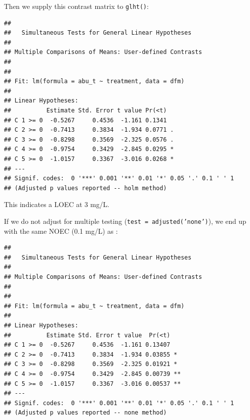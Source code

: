 Then we supply this contrast matrix to \texttt{glht()}:
\begin{knitrout}
\color{fgcolor}\begin{kframe}
\begin{alltt}
\hlstd{(}  \hlstd{=} \hlstd{(} 
              \hlstd{=} \hlstd{),}
         \hlstd{=} \hlstd{(}\hlstd{))}
\end{alltt}
\begin{verbatim}
## 
## 	 Simultaneous Tests for General Linear Hypotheses
## 
## Multiple Comparisons of Means: User-defined Contrasts
## 
## 
## Fit: lm(formula = abu_t ~ treatment, data = dfm)
## 
## Linear Hypotheses:
##          Estimate Std. Error t value Pr(<t)  
## C 1 >= 0  -0.5267     0.4536  -1.161 0.1341  
## C 2 >= 0  -0.7413     0.3834  -1.934 0.0771 .
## C 3 >= 0  -0.8298     0.3569  -2.325 0.0576 .
## C 4 >= 0  -0.9754     0.3429  -2.845 0.0295 *
## C 5 >= 0  -1.0157     0.3367  -3.016 0.0268 *
## ---
## Signif. codes:  0 '***' 0.001 '**' 0.01 '*' 0.05 '.' 0.1 ' ' 1
## (Adjusted p values reported -- holm method)
\end{verbatim}
\end{kframe}
\end{knitrout}

This indicates a LOEC at 3 mg/L.

If we do not adjust for multiple testing (\texttt{test = adjusted('none')}), we end up with the same NOEC  (0.1 mg/L) as \citet{brock_minimum_2015}:
\begin{knitrout}
\color{fgcolor}\begin{kframe}
\begin{alltt}
\hlstd{(}  \hlstd{=} \hlstd{(} 
              \hlstd{=} \hlstd{),}
         \hlstd{=} \hlstd{(}\hlstd{))}
\end{alltt}
\begin{verbatim}
## 
## 	 Simultaneous Tests for General Linear Hypotheses
## 
## Multiple Comparisons of Means: User-defined Contrasts
## 
## 
## Fit: lm(formula = abu_t ~ treatment, data = dfm)
## 
## Linear Hypotheses:
##          Estimate Std. Error t value  Pr(<t)   
## C 1 >= 0  -0.5267     0.4536  -1.161 0.13407   
## C 2 >= 0  -0.7413     0.3834  -1.934 0.03855 * 
## C 3 >= 0  -0.8298     0.3569  -2.325 0.01921 * 
## C 4 >= 0  -0.9754     0.3429  -2.845 0.00739 **
## C 5 >= 0  -1.0157     0.3367  -3.016 0.00537 **
## ---
## Signif. codes:  0 '***' 0.001 '**' 0.01 '*' 0.05 '.' 0.1 ' ' 1
## (Adjusted p values reported -- none method)
\end{verbatim}
\end{kframe}
\end{knitrout}

